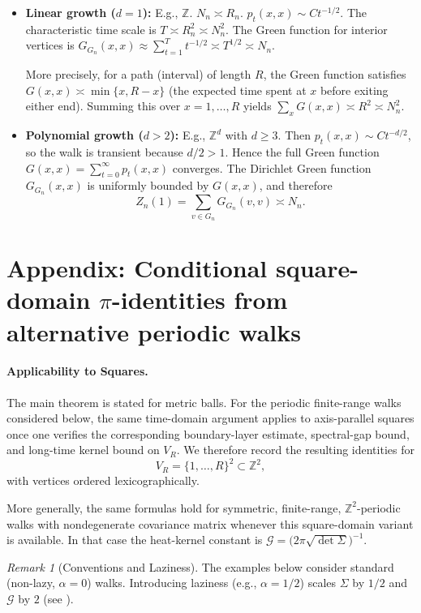 \documentclass[reqno]{amsart}
\providecommand{\texorpdfstring}[2]{#1}
\numberwithin{equation}{section}
\theoremstyle{definition}
\theoremstyle{remark}
\newtheorem{remark}[remark]{Remark}
\newcommand{\cG}{\mathcal{G}}
\begin{document}
\begin{itemize}
\item \textbf{Linear growth ($d=1$):} E.g., $\mathbb{Z}$. $N_n \asymp R_n$. $p_t(x,x) \sim C t^{-1/2}$. The characteristic time scale is $T \asymp R_n^2 \asymp N_n^2$. The Green function for interior vertices is $G_{G_n}(x,x) \approx \sum_{t=1}^{T} t^{-1/2} \asymp T^{1/2} \asymp N_n$.

More precisely, for a path (interval) of length $R$, the Green function satisfies $G(x,x) \asymp \min\{x, R-x\}$ (the expected time spent at $x$ before exiting either end). Summing this over $x=1,\dots,R$ yields $\sum_x G(x,x) \asymp R^2 \asymp N_n^2$.


\item \textbf{Polynomial growth ($d>2$):} E.g., $\mathbb{Z}^d$ with $d\geq 3$. Then $p_t(x,x) \sim C t^{-d/2}$, so the walk is transient because $d/2 > 1$. Hence the full Green function $G(x,x) = \sum_{t=0}^{\infty} p_t(x,x)$ converges. The Dirichlet Green function $G_{G_n}(x,x)$ is uniformly bounded by $G(x,x)$, and therefore
\[
Z_n(1) = \sum_{v \in G_n} G_{G_n}(v,v) \asymp N_n.
\]
\end{itemize}


\section{Appendix: Conditional square-domain \texorpdfstring{$\pi$}{pi}-identities from alternative periodic walks}
\label{app:alt_pi}

\paragraph{Applicability to Squares.}
The main theorem is stated for metric balls. For the periodic finite-range walks considered below, the same time-domain argument applies to axis-parallel squares once one verifies the corresponding boundary-layer estimate, spectral-gap bound, and long-time kernel bound on $V_R$. We therefore record the resulting identities for
\[
V_R=\{1,\dots,R\}^2 \subset \mathbb{Z}^2,
\]
with vertices ordered lexicographically.
\medskip

More generally, the same formulas hold for symmetric, finite-range, $\mathbb{Z}^{2}$-periodic walks with nondegenerate covariance matrix whenever this square-domain variant is available. In that case the heat-kernel constant is $\displaystyle\cG=\bigl(2\pi\sqrt{\det\Sigma}\bigr)^{-1}$.

\begin{remark}[Conventions and Laziness]\label{rem:laziness_appendix}
The examples below consider standard (non-lazy, $\alpha=0$) walks. Introducing laziness (e.g., $\alpha=1/2$) scales $\Sigma$ by $1/2$ and $\cG$ by $2$ (see ).
\end{remark}
\end{document}
